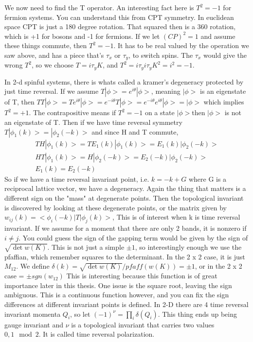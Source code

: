 We now need to find the T operator. An interesting fact here is $T^2 =-1 $ for fermion systems. You can understand this from CPT symmetry. In euclidean space CPT is just a 180 degree rotation. That squared then is a 360 rotation, which is +1 for bosons and -1 for fermions. If we let $(CP)^2=1$ and assume these things commute, then $T^2=-1$. It has to be real valued by the operation we saw above, and has a piece that's $\tau_x$ or $\tau_y$, to switch spins. The $\tau_x$ would give the wrong $T^2$, so we choose $T = i\tau_yK$, and $T^2 = i\tau_yi\tau_yK^2 = i^2 = -1$.

In 2-d spinful systems, there is whats called a kramer's degeneracy protected by just time reversal. If we assume $T|\phi>= e^{i\theta}|\phi>$, meaning $|\phi>$ is an eigenstate of T, then $TT|\phi> = T e^{i\theta}|\phi> = e^{-i\theta}T|\phi>=e^{-i\theta}e^{i\theta}|\phi>= |\phi>$ which implies $T^2=+1$. The contrapositive means if $T^2=-1$ on a state $|\phi>$then $|\phi>$ is not an eigenstate of T. Then if we have time reversal symmetry $T|\phi_1(k)> = |\phi_2(-k)>$ and since H and T commute,
\begin{align}
TH|\phi_1(k)> = TE_1(k)|\phi_1(k)> = E_1(k)|\phi_2(-k)> \\
HT|\phi_1(k)> = H|\phi_2(-k)> = E_2(-k)|\phi_2(-k)> \\
E_1(k)=E_2(-k)
\end{align} 
So if we have a time reversal invariant point, i.e. $k=-k+G$ where G is a reciprocal lattice vector, we have a degeneracy. Again the thing that matters is a different sign on the "mass" at degenerate points. Then the topological invariant is discovered by looking at these degenerate points, or the matrix given by $w_{ij}(k) = <\phi_i(-k)|T|\phi_j(k)>$, This is of interest when k is time reversal invariant. If we assume for a moment that there are only 2 bands, it is nonzero if $i\ne j$. You could guess the sign of the gapping term would be given by the sign of $ \sqrt{\det{w(K)}}$. This is not just a simple $\pm1$, so interestingly enough we use the pfaffian, which remember squares to the determinant. In the 2 x 2 case, it is just $M_{12}$. We define $\delta(k) = \sqrt{\det{w(K)}}/pfaff(w(K)) = \pm 1$, or in the 2 x 2 case = $\pm sgn(w_{12})$ This is interesting because this function is of great importance later in this thesis. One issue is the square root, leaving the sign ambiguous. This is a continuous function however, and you can fix the sign differences at different invariant points is defined. In 2-D there are 4 time reversal invariant momenta $Q_i$, so let $(-1)^\nu = \prod_i \delta(Q_i)$. This thing ends up being gauge invariant and $\nu$ is a topological invariant that carries two values $0,1\mod 2$. It is called time reversal polarization.

